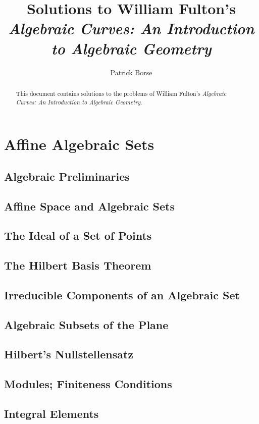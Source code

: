 \documentclass[oneside]{amsbook}
\title{Solutions to William Fulton's\\ \emph{Algebraic Curves: An Introduction to Algebraic Geometry}}
\author{Patrick Borse}
\numberwithin{prob}{chapter}
\begin{document}
\begin{abstract}
This document contains solutions to the problems of William Fulton's \emph{Algebraic Curves: An Introduction to Algebraic Geometry}. 
\end{abstract}

\maketitle

\tableofcontents

\chapter{Affine Algebraic Sets}
\section{Algebraic Preliminaries}

\section{Affine Space and Algebraic Sets}

\section{The Ideal of a Set of Points}

\section{The Hilbert Basis Theorem}

\section{Irreducible Components of an Algebraic Set}

\section{Algebraic Subsets of the Plane}

\section{Hilbert's Nullstellensatz}

\section{Modules; Finiteness Conditions}

\section{Integral Elements}

\end{document}
